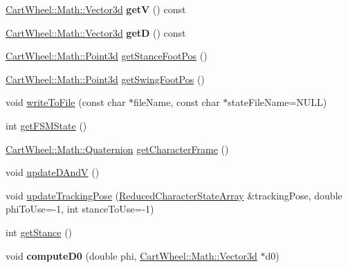 \begin{DoxyCompactItemize}
\item 
\hypertarget{classCartWheel_1_1Core_1_1SimBiController_a91f11cf3273db8a1a989c69aaa7cfe94}{
\hyperlink{classCartWheel_1_1Math_1_1Vector3d}{CartWheel::Math::Vector3d} {\bfseries getV} () const }
\label{classCartWheel_1_1Core_1_1SimBiController_a91f11cf3273db8a1a989c69aaa7cfe94}

\item 
\hypertarget{classCartWheel_1_1Core_1_1SimBiController_a2d6cc42580d9ef2ee788b7bd8276bb35}{
\hyperlink{classCartWheel_1_1Math_1_1Vector3d}{CartWheel::Math::Vector3d} {\bfseries getD} () const }
\label{classCartWheel_1_1Core_1_1SimBiController_a2d6cc42580d9ef2ee788b7bd8276bb35}

\item 
\hyperlink{classCartWheel_1_1Math_1_1Point3d}{CartWheel::Math::Point3d} \hyperlink{classCartWheel_1_1Core_1_1SimBiController_a4d47e5b30f5e40e90ae9ef3d93dc03c9}{getStanceFootPos} ()
\item 
\hyperlink{classCartWheel_1_1Math_1_1Point3d}{CartWheel::Math::Point3d} \hyperlink{classCartWheel_1_1Core_1_1SimBiController_a628d9290279d83b8cf8bb3784ae6a73b}{getSwingFootPos} ()
\item 
void \hyperlink{classCartWheel_1_1Core_1_1SimBiController_a2f83547f429aa769f9a3a580d0b83bbc}{writeToFile} (const char $\ast$fileName, const char $\ast$stateFileName=NULL)
\item 
int \hyperlink{classCartWheel_1_1Core_1_1SimBiController_a658737de9749bd63f391a57376a84a19}{getFSMState} ()
\item 
\hyperlink{classCartWheel_1_1Math_1_1Quaternion}{CartWheel::Math::Quaternion} \hyperlink{classCartWheel_1_1Core_1_1SimBiController_ae649dcba302338b637d21171d4e43a71}{getCharacterFrame} ()
\item 
void \hyperlink{classCartWheel_1_1Core_1_1SimBiController_abf6fceb16393d829c92fe68990960e95}{updateDAndV} ()
\item 
void \hyperlink{classCartWheel_1_1Core_1_1SimBiController_a97b7fc0d744a64ef1ad46335cfd038b5}{updateTrackingPose} (\hyperlink{classCartWheel_1_1Core_1_1ReducedCharacterStateArray}{ReducedCharacterStateArray} \&trackingPose, double phiToUse=-\/1, int stanceToUse=-\/1)
\item 
int \hyperlink{classCartWheel_1_1Core_1_1SimBiController_a172baadc7ceae345b0b7220af9ef6a3f}{getStance} ()
\item 
\hypertarget{classCartWheel_1_1Core_1_1SimBiController_aec2c6d80ca499025769e63d273c1bf79}{
void {\bfseries computeD0} (double phi, \hyperlink{classCartWheel_1_1Math_1_1Vector3d}{CartWheel::Math::Vector3d} $\ast$d0)}
\label{classCartWheel_1_1Core_1_1SimBiController_aec2c6d80ca499025769e63d273c1bf79}


\end{DoxyCompactItemize}
